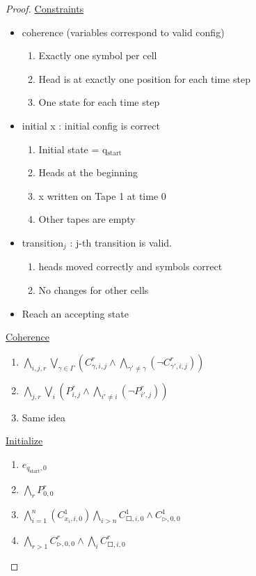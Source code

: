 \documentclass{article}
\theoremstyle{definition}
\theoremstyle{remark}
\begin{document}
\begin{proof}
	\underline{Constraints}
	\begin{itemize}
		\item coherence (variables correspond to valid config)
		\begin{enumerate}
			\item Exactly one symbol per cell
			\item Head is at exactly one position for each time step
			\item One state for each time step
		\end{enumerate}
		\item initial x : initial config is correct
		\begin{enumerate}
			\item Initial state = q$_{\text{start}}$
			\item Heads at the beginning
			\item x written on Tape 1 at time 0
			\item Other tapes are empty
		\end{enumerate}
		\item transition$_j$ : j-th transition is valid.
		\begin{enumerate}
			\item heads moved correctly and symbols correct
			\item No changes for other cells
		\end{enumerate}
		\item Reach an accepting state
	\end{itemize}
	
	\underline{Coherence}
	\begin{enumerate}
		\item $\bigwedge\limits_{i,j,r}\bigvee\limits_{\gamma \in \Gamma}(C^r_{\gamma,i,j}\wedge\bigwedge\limits_{\gamma' \neq \gamma}(\neg C^r_{\gamma',i,j}))$
		\item $\bigwedge\limits_{j,r}\bigvee\limits_{i}(P^r_{i,j}\wedge\bigwedge\limits_{i' \neq i}(\neg P^r_{i',j}))$
		\item Same idea
	\end{enumerate}
	
	\underline{Initialize}
	\begin{enumerate}
		\item $e_{q_{\text{start}},0}$
		\item $\bigwedge\limits_r P^r_{0,0}$
		\item $\bigwedge\limits_{i=1}^{n}(C^1_{x_i,i,0})\bigwedge\limits_{i>n} C^1_{\Square,i,0} \wedge C^1_{\rhd,0,0}$
		\item $\bigwedge\limits_{r>1} C^r_{\rhd,0,0} \wedge \bigwedge\limits_i C^r_{\Square,i,0}$
	\end{enumerate}
	

\end{proof}
\end{document}
